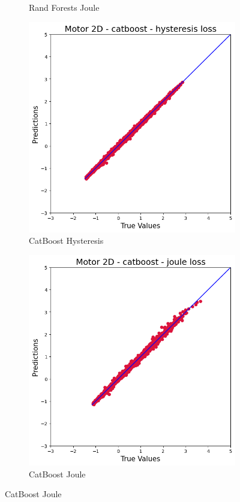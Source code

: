 \documentclass{article}
\begin{document}
\begin{figure}[!htbp]
\begin{subfigure}[b]{0.23\textwidth}
        \caption{Rand Forests Joule}
    \end{subfigure}
    \hfill
    \begin{subfigure}[b]{0.23\textwidth}
        \centering
        \includegraphics[width=\textwidth]{images/2D/catboost_hysteresis.png}
        \caption{CatBoost Hysteresis}
    \end{subfigure}
    \hfill
    \begin{subfigure}[b]{0.23\textwidth}
        \centering
        \includegraphics[width=\textwidth]{images/2D/catboost_joule.png}
        \caption{CatBoost Joule}
    \end{subfigure}
    

\end{figure}
\end{document}
